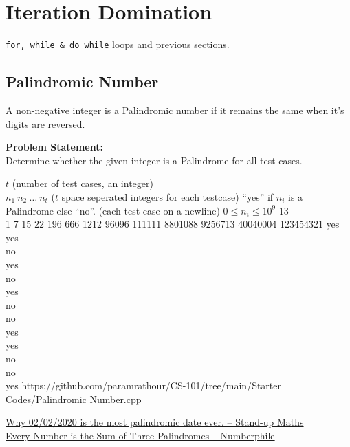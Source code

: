 \section{Iteration Domination}
\begin{topics}
\verb!for, while & do while! loops and previous sections.
\end{topics}
\subsection{Palindromic Number}
A non-negative integer is a Palindromic number if it remains the same when it's digits are reversed.

\textbf{Problem Statement:}\\
Determine whether the given integer is a Palindrome for all test cases.
\begin{testcases}
	{$t$ \hfill(number of test cases, an integer)\\
	$n_1\ n_2\ \ldots\ n_t$ \hfill($t$ space seperated integers for each testcase)}
	{``yes'' if $n_i$ is a Palindrome else ``no''. \hfill(each test case on a newline)}
	{$0 \leq n_i \leq 10^{9}$}
	{13\\1 7 15 22 196 666 1212 96096 111111 8801088 9256713 40040004 123454321}
	{yes\\yes\\no\\yes\\no\\yes\\no\\no\\yes\\yes\\no\\no\\yes}
	{https://github.com/paramrathour/CS-101/tree/main/Starter Codes/Palindromic Number.cpp}
\end{testcases}
\begin{funvideo}
\href{https://youtu.be/4fE_sXZjxng}{Why 02/02/2020 is the most palindromic date ever. -- Stand-up Maths}\\
\href{https://youtu.be/OKhacWQ2fCs}{Every Number is the Sum of Three Palindromes -- Numberphile}
\end{funvideo}
